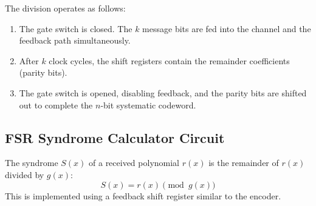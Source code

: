 \documentclass[12pt,a4paper]{article}
\begin{document}
\begin{tcolorbox}[tikzbox, title={Systematic Cyclic Encoder Circuit}]
\centering
{}
\end{tcolorbox}

The division operates as follows:
\begin{enumerate}[leftmargin=*, itemsep=3pt]
  \item The gate switch is closed. The $k$ message bits are fed into the channel and the feedback path simultaneously.
  \item After $k$ clock cycles, the shift registers contain the remainder coefficients (parity bits).
  \item The gate switch is opened, disabling feedback, and the parity bits are shifted out to complete the $n$-bit systematic codeword.
\end{enumerate}

\subsection{FSR Syndrome Calculator Circuit}
The syndrome $S(x)$ of a received polynomial $r(x)$ is the remainder of $r(x)$ divided by $g(x)$:
\[ S(x) = r(x) \pmod{g(x)} \]
This is implemented using a feedback shift register similar to the encoder.
\end{document}
